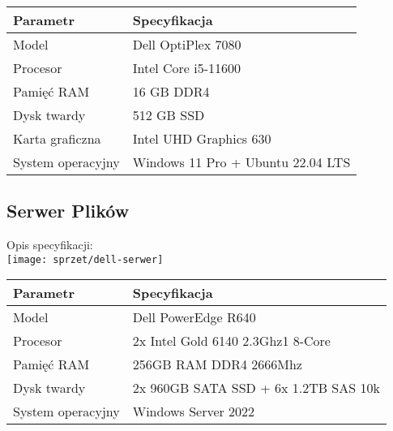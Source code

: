     \begin{flushleft}
        \begin{table}[h]
            \renewcommand{\arraystretch}{1.5}
            \begin{tabular}{|l|l|}
            \hline
                \textbf{Parametr} & \textbf{Specyfikacja} \\
            \hline
                Model & Dell OptiPlex 7080 \\
                Procesor & Intel Core i5-11600 \\
                Pamięć RAM & 16 GB DDR4 \\
                Dysk twardy & 512 GB SSD \\
                Karta graficzna & Intel UHD Graphics 630 \\
                System operacyjny & Windows 11 Pro + Ubuntu 22.04 LTS \\
            \hline
            \end{tabular}
        \end{table}  
    \end{flushleft}
\pagebreak

\subsection{Serwer Plików}

    Opis specyfikacji:\\
    \texttt{[image: sprzet/dell-serwer]}

    \begin{flushleft}
        \begin{table}[h]
            \renewcommand{\arraystretch}{1.5}
            \begin{tabular}{|l|l|}
            \hline
                \textbf{Parametr} & \textbf{Specyfikacja} \\
            \hline
                Model & Dell PowerEdge R640 \\
                Procesor & 2x Intel Gold 6140 2.3Ghz1 8-Core \\
                Pamięć RAM & 256GB RAM DDR4 2666Mhz \\
                Dysk twardy & 2x 960GB SATA SSD + 6x 1.2TB SAS 10k \\
                System operacyjny & Windows Server 2022 \\
            \hline
            \end{tabular}
        \end{table}  
    \end{flushleft}


